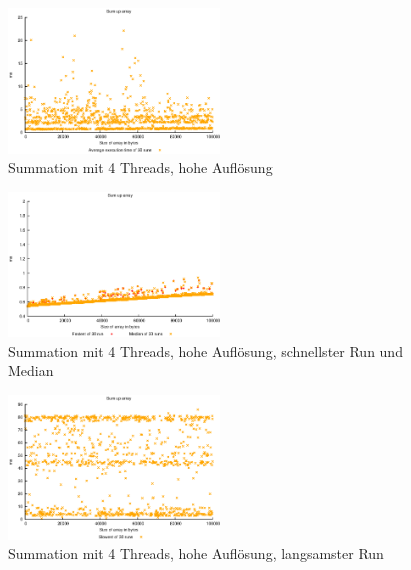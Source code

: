 \documentclass[a4paper,
12pt,
BCOR12mm,
]{scrartcl}
\begin{document}
\begin{figure}[!h]
	\begin{center}
		\includegraphics[width=0.5\textwidth]{../a_4_1/graphs/4_summation_average.eps}
	\end{center}
	\caption{Summation mit 4 Threads, hohe Auflösung}
	\label{fig:summation_4threads_avg}
\end{figure}
\begin{figure}[!h]
	\begin{center}
		\includegraphics[width=0.5\textwidth]{../a_4_1/graphs/4_summation_fastestandmedian.eps}
	\end{center}
	\caption{Summation mit 4 Threads, hohe Auflösung, schnellster Run und Median}
	\label{fig:summation_4threads_median}
\end{figure}
\begin{figure}[!h]
	\begin{center}
		\includegraphics[width=0.5\textwidth]{../a_4_1/graphs/4_summation_slowest.eps}
	\end{center}
	\caption{Summation mit 4 Threads, hohe Auflösung, langsamster Run}
	\label{fig:summation_4threads_slowest}
\end{figure}
\clearpage
\end{document}
